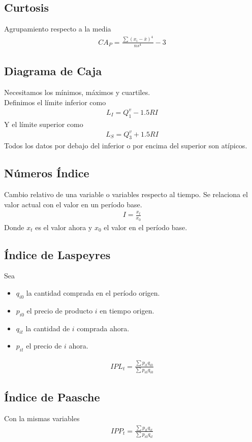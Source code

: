 \documentclass{article}
\begin{document}
\subsection{Curtosis}
Agrupamiento respecto a la media
\begin{equation}
    \begin{split}
        CA_P= \frac{\sum (x_i-\bar{x})^4}{ns^4}-3
    \end{split}
\end{equation}
\subsection{Diagrama de Caja}
Necesitamos los mínimos, máximos y cuartiles.\\
Definimos el límite inferior como
\begin{equation}
    \begin{split}
        L_I= Q_1^v-1.5RI
    \end{split}
\end{equation}
Y el límite superior como
\begin{equation}
    \begin{split}
        L_S=Q_3^v+1.5RI
    \end{split}
\end{equation}
Todos los datos por debajo del inferior o por encima del superior son atípicos.
\subsection{Números Índice}
Cambio relativo de una variable o variables respecto al tiempo. Se relaciona el valor actual con el valor en un período base.
\begin{equation}
    \begin{split}
        I= \frac{x_t}{x_0}
    \end{split}
\end{equation}
Donde $x_t$ es el valor ahora y $x_0$ el valor en el período base.
\subsection{Índice de Laspeyres}
Sea
\begin{itemize}
    \item $q_{i0}$ la cantidad comprada en el período origen.
    \item $p_{i0}$ el precio de producto $i$ en tiempo origen.
    \item $q_{it}$ la cantidad de $i$ comprada ahora.
    \item $p_{it}$ el precio de $i$ ahora.
\end{itemize}
\begin{equation}
    \begin{split}
        IPL_t= \frac{\sum p_{it}q_{i0}}{\sum p_{i0}q_{i0}}
    \end{split}
\end{equation}
\subsection{Índice de Paasche}
Con la mismas variables
\begin{equation}
    \begin{split}
        IPP_t = \frac{\sum p_{it} q_{it}}{\sum p_{i0} q_{it}}
    \end{split}
\end{equation}
\end{document}
